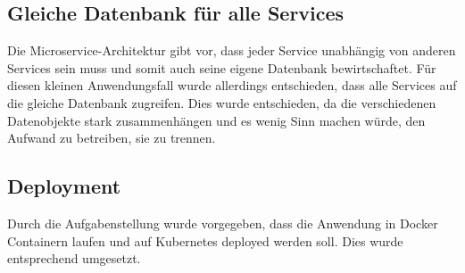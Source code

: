 \subsection{Gleiche Datenbank für alle Services}
Die Microservice-Architektur gibt vor, dass jeder Service unabhängig von anderen Services sein muss und somit auch seine eigene Datenbank bewirtschaftet. Für diesen kleinen
Anwendungsfall wurde allerdings entschieden, dass alle Services auf die gleiche Datenbank zugreifen. Dies wurde entschieden, da die verschiedenen Datenobjekte stark zusammenhängen
und es wenig Sinn machen würde, den Aufwand zu betreiben, sie zu trennen.

\subsection{Deployment}
Durch die Aufgabenstellung wurde vorgegeben, dass die Anwendung in Docker Containern laufen und auf Kubernetes deployed werden soll. Dies wurde entsprechend umgesetzt.
